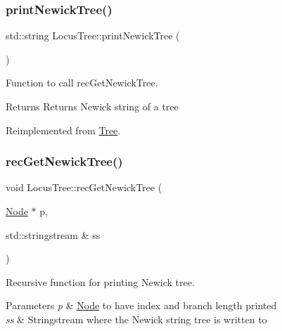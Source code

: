 \subsubsection{\texorpdfstring{printNewickTree()}{printNewickTree()}}
{\footnotesize\ttfamily std\+::string Locus\+Tree\+::print\+Newick\+Tree (\begin{DoxyParamCaption}{ }\end{DoxyParamCaption})\hspace{0.3cm}{\ttfamily [virtual]}}



Function to call rec\+Get\+Newick\+Tree. 

\begin{DoxyReturn}{Returns}
Returns Newick string of a tree 
\end{DoxyReturn}


Reimplemented from \mbox{\hyperlink{class_tree}{Tree}}.

\mbox{\label{class_locus_tree_ae7ea80d7265d1a65949f32968b1ebb89}} 
\subsubsection{\texorpdfstring{recGetNewickTree()}{recGetNewickTree()}}
{\footnotesize\ttfamily void Locus\+Tree\+::rec\+Get\+Newick\+Tree (\begin{DoxyParamCaption}\item[{\mbox{\hyperlink{class_node}{Node}} $\ast$}]{p,  }\item[{std\+::stringstream \&}]{ss }\end{DoxyParamCaption})}



Recursive function for printing Newick tree. 


\begin{DoxyParams}{Parameters}
{\em p} & \mbox{\hyperlink{class_node}{Node}} to have index and branch length printed \\
\hline
{\em ss} & Stringstream where the Newick string tree is written to \\
\hline
\end{DoxyParams}
\mbox{\label{class_locus_tree_ad6debdb569a14d29e34fa9557b9c31aa}} 
